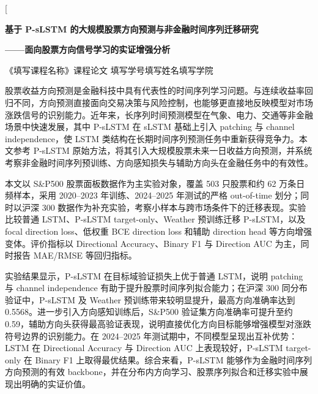 \documentclass[UTF8,a4paper,twocolumn]{ctexart}
\newcommand{\studentid}{填写学号}
\newcommand{\studentname}{填写姓名}
\newcommand{\college}{填写学院}
\newcommand{\coursename}{填写课程名称}
\newcommand{\papertitle}{基于 P-sLSTM 的大规模股票方向预测与非金融时间序列迁移研究}
\newcommand{\papersubtitle}{面向股票方向信号学习的实证增强分析}
\begin{document}
\justifying
\thispagestyle{fancy}

\twocolumn[
\begin{center}
{\bfseries{} \papertitle\par}
\vspace{0.4em}
{\bfseries{} ——\papersubtitle\par}
\vspace{0.5em}
{《\coursename》课程论文 \quad \studentid\studentname \quad \college\par}
\end{center}

\vspace{0.4em}

\vspace{0.2em}

{
股票收益方向预测是金融科技中具有代表性的时间序列学习问题。与连续收益率回归不同，方向预测直接面向交易决策与风险控制，也能够更直接地反映模型对市场涨跌信号的识别能力。近年来，长序列时间预测模型在气象、电力、交通等非金融场景中快速发展，其中 P-sLSTM 在 sLSTM 基础上引入 patching 与 channel independence，使 LSTM 类结构在长期时间序列预测任务中重新获得竞争力。本文参考 P-sLSTM 原始方法，将其引入大规模股票未来一日收益方向预测，并系统考察非金融时间序列预训练、方向感知损失与辅助方向头在金融任务中的有效性。

本文以 S\&P500 股票面板数据作为主实验对象，覆盖 503 只股票和约 62 万条日频样本，采用 2020--2023 年训练、2024--2025 年测试的严格 out-of-time 划分；同时以沪深 300 数据作为补充实验，考察小样本与跨市场条件下的迁移表现。实验比较普通 LSTM、P-sLSTM target-only、Weather 预训练迁移 P-sLSTM，以及 focal direction loss、低权重 BCE direction loss 和辅助 direction head 等方向增强变体。评价指标以 Directional Accuracy、Binary F1 与 Direction AUC 为主，同时报告 MAE/RMSE 等回归指标。

实验结果显示，P-sLSTM 在目标域验证损失上优于普通 LSTM，说明 patching 与 channel independence 有助于提升股票时间序列拟合能力；在沪深 300 同分布验证中，P-sLSTM 及 Weather 预训练带来较明显提升，最高方向准确率达到 0.5568。进一步引入方向感知训练后，S\&P500 验证集方向准确率可提升至约 0.59，辅助方向头获得最高验证表现，说明直接优化方向目标能够增强模型对涨跌符号边界的识别能力。在 2024--2025 年测试期中，不同模型呈现出互补优势：LSTM 在 Directional Accuracy 与 Direction AUC 上表现较好，P-sLSTM target-only 在 Binary F1 上取得最优结果。综合来看，P-sLSTM 能够作为金融时间序列方向预测的有效 backbone，并在分布内方向学习、股票序列拟合和迁移实验中展现出明确的实证价值。
\par}
\end{document}
